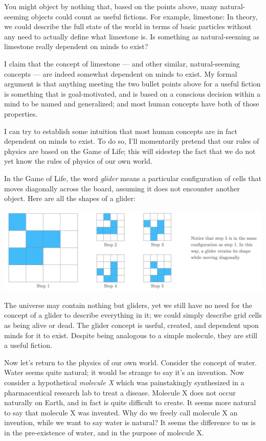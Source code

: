 \documentclass[11pt, oneside]{article}
\begin{document}
You might object by nothing that, based on the points above,
many natural-seeming objects could count as useful fictions.
For example, limestone: In theory, we could describe the full state of the world
in terms of basic particles without any need to actually
define what limestone is. Is something as natural-seeming as limestone really
dependent on minds to exist?

I claim that the concept of limestone --- and other similar, natural-seeming
concepts --- are indeed somewhat dependent on minds to exist.
My formal argument is that anything meeting the two bullet points above for a
useful fiction is something that is goal-motivated, and is based on a conscious
decision within a mind to be named and generalized; and most human concepts have
both of those properties.

I can try to establish some intuition that most human concepts are in fact
dependent on minds to exist. To do so, I'll momentarily pretend that our rules
of physics are based on the Game of Life; this will sidestep the fact that we do
not yet know the rules of physics of our own world.

In the Game of Life, the word {\em glider} means a particular 
configuration of cells that moves diagonally across the board, assuming it does
not encounter another object.
% 
% 
Here are all the shapes of a glider:
\begin{center}
\includegraphics[width=14cm]{glider2.png}
\end{center}
The universe may contain nothing but gliders, yet we still have no need
for the concept of a glider to describe everything in it; we could simply
describe grid cells as being alive or dead.
The glider concept is useful, created, and dependent upon minds for it to
exist. Despite being analogous to a simple molecule, they are still a useful
fiction.

Now let's return to the physics of our own world. Consider the concept of water.
Water seems quite natural;
it would be strange to say it's an invention.
Now consider a hypothetical {\em molecule X} which was painstakingly synthesized
in a pharmaceutical research lab to treat a disease.
Molecule X does not occur naturally on Earth,
and in fact is quite difficult to create. It seems more natural to say that
molecule X was invented.
Why do we freely call molecule X an invention, while we want to say
water is natural?
It seems the difference to us is in the pre-existence of water, and
in the purpose of molecule X.
\end{document}

